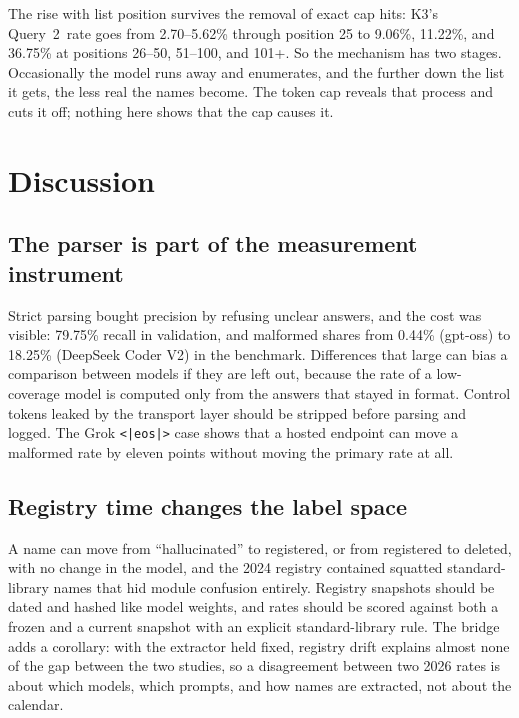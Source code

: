 \documentclass[10pt,twocolumn,letterpaper]{article}
\newcommand{\qtwo}{Query~2}
\begin{document}
The rise with list position survives the removal of exact cap hits: K3's \qtwo\ rate goes from
2.70--5.62\% through position 25 to 9.06\%, 11.22\%, and 36.75\% at positions 26--50, 51--100, and
101+. So the mechanism has two stages. Occasionally the model runs away and enumerates, and the
further down the list it gets, the less real the names become. The token cap reveals that process and
cuts it off; nothing here shows that the cap causes it.

\section{Discussion}
\label{sec:discussion}

\subsection{The parser is part of the measurement instrument}

Strict parsing bought precision by refusing unclear answers, and the cost was visible: 79.75\% recall
in validation, and malformed shares from 0.44\% (gpt-oss) to 18.25\% (DeepSeek Coder V2) in the
benchmark. Differences that large can bias a comparison between models if they are left out, because
the rate of a low-coverage model is computed only from the answers that stayed in format. Control
tokens leaked by the transport layer should be stripped before parsing and logged. The Grok
\texttt{<|eos|>} case shows that a hosted endpoint can move a malformed rate by eleven points without
moving the primary rate at all.

\subsection{Registry time changes the label space}

A name can move from ``hallucinated'' to registered, or from registered to deleted, with no change in
the model, and the 2024 registry contained squatted standard-library names that hid module confusion
entirely. Registry snapshots should be dated and hashed like model weights, and rates should be scored
against both a frozen and a current snapshot with an explicit standard-library rule. The bridge adds a
corollary: with the extractor held fixed, registry drift explains almost none of the gap between the
two studies, so a disagreement between two 2026 rates is about which models, which prompts, and how
names are extracted, not about the calendar.
\end{document}
